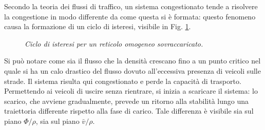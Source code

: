\documentclass[../main.tex]{subfiles}
\begin{document}
Secondo la teoria dei flussi di traffico, un sistema congestionato tende a risolvere la congestione in modo differente da come questa si \`e formata: questo fenomeno causa la formazione di un ciclo di isteresi, visibile in Fig. \ref{fig:hysteresys_peaked_homo}.
\begin{figure}[H]
    \hfill
    \caption[Isteresi per un reticolo omogeneo sovraccaricato]{\emph{Ciclo di isteresi per un reticolo omogeneo sovraccaricato.}}
    \label{fig:hysteresys_peaked_homo}
\end{figure}
Si pu\`o notare come sia il flusso che la densit\`a crescano fino a un punto critico nel quale si ha un calo drastico del flusso dovuto all'eccessiva presenza di veicoli sulle strade.
Il sistema risulta qui congestionato e perde la capacit\`a di trasporto.
Permettendo ai veicoli di uscire senza rientrare, si inizia a scaricare il sistema: lo scarico, che avviene gradualmente, prevede un ritorno alla stabilit\`a lungo una traiettoria differente rispetto alla fase di carico.
Tale differenza \`e visibile sia sul piano $\Phi/\rho$, sia sul piano $\bar{v}/\rho$.
\end{document}
